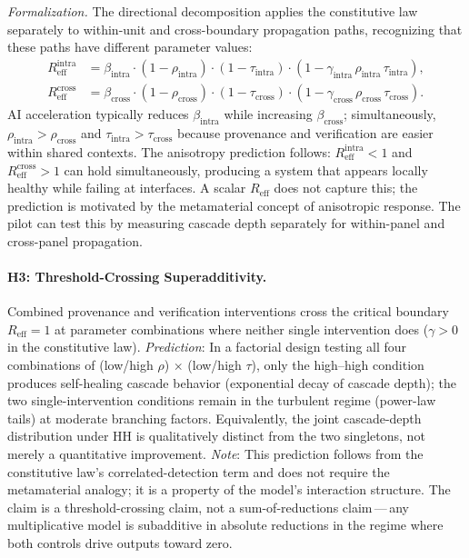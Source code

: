 \documentclass[runningheads]{llncs}
\begin{document}
\emph{Formalization.} The directional decomposition applies the constitutive law separately to within-unit and cross-boundary propagation paths, recognizing that these paths have different parameter values:
\begin{align}
R_{\mathrm{eff}}^{\mathrm{intra}} &= \beta_{\mathrm{intra}} \cdot (1-\rho_{\mathrm{intra}}) \cdot (1-\tau_{\mathrm{intra}}) \cdot (1-\gamma_{\mathrm{intra}}\, \rho_{\mathrm{intra}}\, \tau_{\mathrm{intra}}), \label{eq:rintra} \\
R_{\mathrm{eff}}^{\mathrm{cross}} &= \beta_{\mathrm{cross}} \cdot (1-\rho_{\mathrm{cross}}) \cdot (1-\tau_{\mathrm{cross}}) \cdot (1-\gamma_{\mathrm{cross}}\, \rho_{\mathrm{cross}}\, \tau_{\mathrm{cross}}). \label{eq:rcross}
\end{align}
AI acceleration typically reduces $\beta_{\mathrm{intra}}$ while increasing $\beta_{\mathrm{cross}}$; simultaneously, $\rho_{\mathrm{intra}} > \rho_{\mathrm{cross}}$ and $\tau_{\mathrm{intra}} > \tau_{\mathrm{cross}}$ because provenance and verification are easier within shared contexts. The anisotropy prediction follows: $R_{\mathrm{eff}}^{\mathrm{intra}} < 1$ and $R_{\mathrm{eff}}^{\mathrm{cross}} > 1$ can hold simultaneously, producing a system that appears locally healthy while failing at interfaces. A scalar $R_{\mathrm{eff}}$ does not capture this; the prediction is motivated by the metamaterial concept of anisotropic response. The pilot can test this by measuring cascade depth separately for within-panel and cross-panel propagation.

\paragraph{H3: Threshold-Crossing Superadditivity.}
Combined provenance and verification interventions cross the critical boundary $R_{\mathrm{eff}} = 1$ at parameter combinations where neither single intervention does ($\gamma > 0$ in the constitutive law). \emph{Prediction}: In a factorial design testing all four combinations of (low/high $\rho$) $\times$ (low/high $\tau$), only the high--high condition produces self-healing cascade behavior (exponential decay of cascade depth); the two single-intervention conditions remain in the turbulent regime (power-law tails) at moderate branching factors. Equivalently, the joint cascade-depth distribution under HH is qualitatively distinct from the two singletons, not merely a quantitative improvement. \emph{Note}: This prediction follows from the constitutive law's correlated-detection term and does not require the metamaterial analogy; it is a property of the model's interaction structure. The claim is a threshold-crossing claim, not a sum-of-reductions claim\,---\,any multiplicative model is subadditive in absolute reductions in the regime where both controls drive outputs toward zero.
\end{document}
